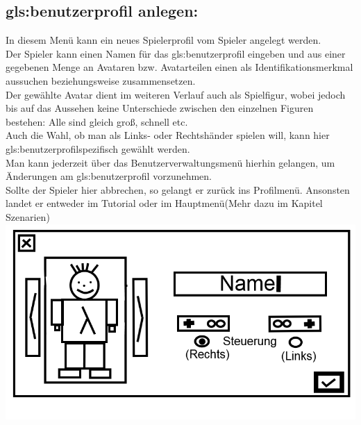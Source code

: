 \documentclass{scrartcl}
\begin{document}
\begin{enumerate}
	\begin{minipage}{1\textwidth}
		\item \subsection*{\gls{gls:benutzerprofil} anlegen:}
		In diesem Menü kann ein neues Spielerprofil vom Spieler angelegt werden.\\
		Der Spieler kann einen Namen für das \gls{gls:benutzerprofil} eingeben und aus einer gegebenen Menge an Avataren bzw. Avatarteilen einen als Identifikationsmerkmal aussuchen beziehungsweise zusammensetzen.\\
		Der gewählte Avatar dient im weiteren Verlauf auch als Spielfigur, wobei jedoch bis auf das Aussehen keine Unterschiede zwischen den einzelnen Figuren bestehen: Alle sind gleich groß, schnell etc.\\
		Auch die Wahl, ob man als Links- oder Rechtshänder spielen will, kann hier \gls{gls:benutzerprofil}spezifisch gewählt werden.\\
		Man kann jederzeit über das Benutzerverwaltungsmenü hierhin gelangen, um Änderungen am \gls{gls:benutzerprofil} vorzunehmen.\\
		Sollte der Spieler hier abbrechen, so gelangt er zurück ins Profilmenü. Ansonsten landet er entweder im Tutorial oder im Hauptmenü(Mehr dazu im Kapitel Szenarien)\\
		\includegraphics[scale=0.5]{assets/CreateProfile2}
	\end{minipage}
	

\end{enumerate}
\end{document}
